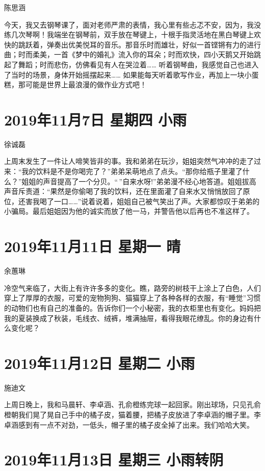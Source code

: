陈思涵

今天，我又去钢琴课了，面对老师严肃的表情，我心里有些忐忑不安，因为，我没练几次琴啊！我端坐在钢琴前，双手放在琴键上，十根手指灵活地在黑白琴键上欢快的跳跃着，弹奏出优美悦耳的音乐。那音乐时而雄壮，好似一首铿锵有力的进行曲；时而柔美，一首《梦中的婚礼》流入你的耳朵；时而欢快，四小天鹅又开始跳起了舞蹈；时而悲伤，仿佛看见有人在哭泣着…… 听着钢琴曲，我感觉自己也进入了当时的场景，身体开始摇摆起来…… 如果能每天听着歌写作业，再加上一块小蛋糕，那可能是世界上最浪漫的做作业方式吧！

\section{2019年11月7日 星期四 小雨}

徐诚磊

上周末发生了一件让人啼笑皆非的事。我和弟弟在玩沙，姐姐突然气冲冲的走了过来：“我的饮料是不是你喝完了？”弟弟呆萌地点了点头。“那你给瓶子里灌了什么？”姐姐的声音提高了一个分贝。“\,”自来水呀!”弟弟漫不经心地答道。姐姐拔高声音斥责道：“果然是你偷喝了我的饮料，还在里面灌了自来水又悄悄放回了原位，还害我喝了一口……”说着说着，姐姐自己被气笑出了声。大家都惊叹于弟弟的小骗局。最后姐姐因为他的诚实而放了他一马，并警告他以后再也不准这样了。

\section{2019年11月11日 星期一 晴}

余蕙琳

冷空气来临了，大街上有许许多多的变化。瞧，路旁的树枝干上涂上了白色，人们穿上了厚厚的衣服，可爱的宠物狗狗、猫猫穿上了各种各样的衣服，有“睡觉”习惯的动物们也有自己的准备的。告诉你们一个小秘密，我的衣柜里也有变化。妈妈把我的夏装换成了秋装，毛线衣、绒裤，堆满抽屉，看得我眼花缭乱。你的身边有什么变化呢？

\section{2019年11月12日 星期二 小雨}

施迪文

上周日晚上，我和马晨轩、李卓涵、孔俞橙练完球一起回家。刚出球场，只见孔俞橙朝我们晃了晃自己手中的橘子皮，猫着腰，把橘子皮放进了李卓涵的帽子里。李卓涵感到有一点不对劲，一低头，帽子里的橘子皮全掉了出来。我们哈哈大笑。

\section{2019年11月13日 星期三 小雨转阴}

